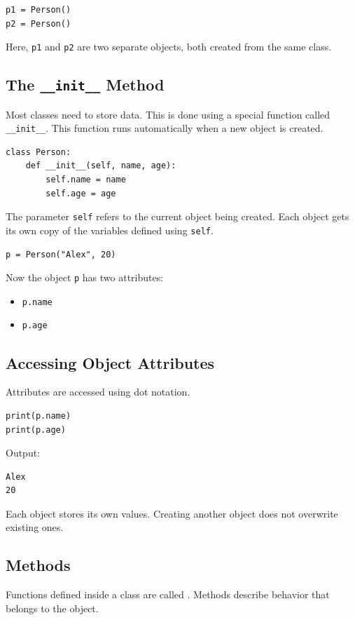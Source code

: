 \begin{verbatim}
p1 = Person()
p2 = Person()
\end{verbatim}

Here, \texttt{p1} and \texttt{p2} are two separate objects, both created
from the same class.

\subsection{The \texttt{\_\_init\_\_} Method}
Most classes need to store data. This is done using a special function called
\texttt{__init__}. This function runs automatically when a new object is created.

\begin{verbatim}
class Person:
    def __init__(self, name, age):
        self.name = name
        self.age = age
\end{verbatim}

The parameter \texttt{self} refers to the current object being created.
Each object gets its own copy of the variables defined using \texttt{self}.

\begin{verbatim}
p = Person("Alex", 20)
\end{verbatim}

Now the object \texttt{p} has two attributes:
\begin{itemize}
    \item \texttt{p.name}
    \item \texttt{p.age}
\end{itemize}

\subsection{Accessing Object Attributes}
Attributes are accessed using dot notation.

\begin{verbatim}
print(p.name)
print(p.age)
\end{verbatim}

Output:
\begin{verbatim}
Alex
20
\end{verbatim}

Each object stores its own values. Creating another object does not overwrite
existing ones.

\subsection{Methods}
Functions defined inside a class are called .
Methods describe behavior that belongs to the object.

